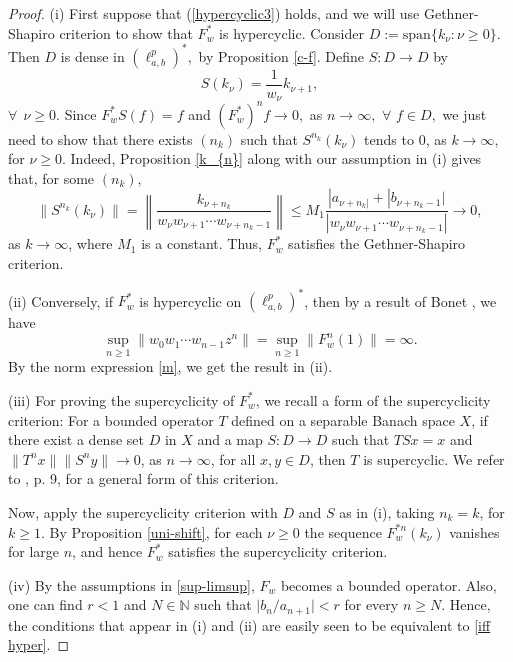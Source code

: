 \documentclass[12pt, reqno]{amsart}
\theoremstyle{definition}
\theoremstyle{remark}
\numberwithin{equation}{section}
\begin{document}
\begin{proof}  (i) First suppose that (\ref{hypercyclic3}) holds, and we will use Gethner-Shapiro criterion to show that $F_{w}^{*}$ is hypercyclic. Consider $D:=\text{span}\{k_{\nu}:\nu \geq 0\}$. Then $D$ is dense in $(\ell^{p}_{a,b})^{*},$ by Proposition \ref{c-f}. Define $S:D\rightarrow D$ by 
\[
S(k_{\nu})=\frac{1}{w_{\nu}}k_{\nu+1},
\]
$\forall~~ \nu\geq 0.$ Since $F_{w}^{*}S(f)=f$ and $(F_{w}^{*})^{n}f\to 0,$ as $n \to \infty,$  $\forall$ $f\in D,$ we just need to show that there exists $(n_k)$ such that $S^{n_{k}}(k_{\nu})$ tends to $0$, as $k \to \infty,$ for $\nu\geq 0$. Indeed, Proposition \ref{k_{n}} along with our assumption in (i) gives that, for some $(n_k)$,
       \[
       \lVert S^{n_{k}}(k_{\nu}) \rVert=\left\lVert\frac{k_{\nu+n_{k} }}{w_{\nu}w_{\nu+1}\cdots w_{\nu+n_{k}-1}} \right\rVert\leq M_{1}\frac{|a_{\nu+n_{k}|}+|b_{\nu+n_k-1}|}{|w_{\nu}w_{\nu+1}\cdots w_{\nu+n_{k}-1}|} \longrightarrow 0,
       \]
       as $k\rightarrow \infty$, where $M_{1}$ is a constant. Thus, $ F_{w}^{*}$ satisfies the Gethner-Shapiro criterion. 
       
       (ii) Conversely, if  $F_{w}^{*}$ is hypercyclic on $(\ell^{p}_{a,b})^{*}$, then by a result of Bonet \cite{Bonet1}, we have 
       \[
       \sup_{n\geq 1} \|w_0w_1\cdots w_{n-1}z^n\|=\sup_{n\geq 1} \|F_w^n(1)\|=\infty.
       \]
       By the norm expression \eqref{m}, we get the result in (ii).

       (iii) For proving the supercyclicity of $F_w^*$, we recall a form of the supercyclicity criterion: For a bounded operator $T$ defined on a separable Banach space $X$, if there exist a dense set $D$ in $X$ and a map $S:D\rightarrow D$ such that $TSx=x$ and $\|T^nx\|\|S^ny\|\rightarrow 0$, as $n\rightarrow \infty$, for all $x,y\in D$, then $T$ is supercyclic. We refer to \cite{Bayart-Matheron}, p. 9, for a general form of this criterion.
       
       
       Now, apply the supercyclicity criterion with $D$ and $S$ as in (i), taking $n_k=k$, for $k\geq 1$. By Proposition \ref{uni-shift}, for each $\nu\geq 0$ the sequence $F_w^{*n}(k_{\nu})$ vanishes for large $n$, and hence $F_w^*$ satisfies the supercyclicity criterion.

       (iv) By the assumptions in \eqref{sup-limsup}, $F_w$ becomes a bounded operator. Also, one can find $r<1$ and $N\in \mathbb{N}$ such that $\big| b_n/a_{n+1}\big|<r$ for every $n\geq N$. Hence, the conditions that appear in (i) and (ii) are easily seen to be equivalent to \eqref{iff hyper}. 

\end{proof}
\end{document}
